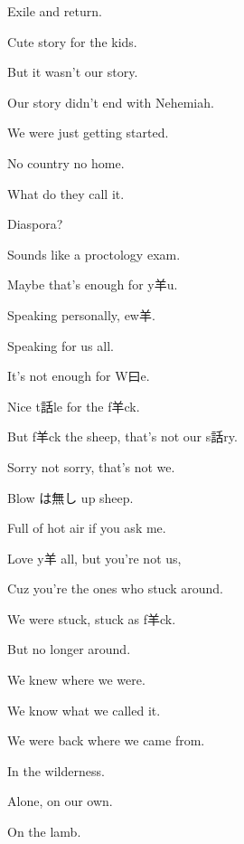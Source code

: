 {
    \hX{}
}
{
    \eX{
    }
}
{
    	Exile and return.
    	
    	Cute story for the kids.

        But it wasn't our story.

		Our story didn't end with Nehemiah.

    	We were just getting started.

        No country no home.

		What do they call it.
		
		Diaspora?

		Sounds like a proctology exam.

		Maybe that's enough for y羊u.

		Speaking personally, ew羊.
		
		Speaking for us all.
		
		It's not enough for W曰e.

		Nice t話le for the f羊ck.

		But f羊ck the sheep, that's not our s話ry.

		Sorry not sorry, that's not we.

		Blow は無し up sheep.

		Full of hot air if you ask me.

		Love y羊 all, but you're not us,
		
		Cuz you're the ones who stuck around.

		We were stuck, stuck as f羊ck.
		
		But no longer around.

		We knew where we were.

		We know what we called it.

        We were back where we came from.
 
		In the wilderness.

        Alone, on our own.

        On the lamb.
}

